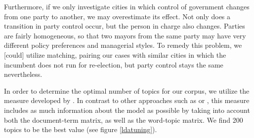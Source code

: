 \documentclass[11pt]{article}
\begin{document}
Furthermore, if we only investigate cities in which control of government changes from one party to another, we may overestimate its effect. Not only does a transition in party control occur, but the person in charge also changes. Parties are fairly homogeneous, so that two mayors from the same party may have very different policy preferences and managerial styles. To remedy this problem, we [could] utilize matching, pairing our cases with similar cities in which the incumbent does not run for re-election, but party control stays the same nevertheless.

In order to determine the optimal number of topics for our corpus, we utilize the measure developed by \cite{Arun2010}. In contrast to other approaches such as \cite{Cao2009} or \cite{Griffith2004}, this measure includes as much information about the model as possible by taking into account both the document-term matrix, as well as the word-topic matrix. We find 200 topics to be the best value (see figure \ref{ldatuning}).





\end{document}
